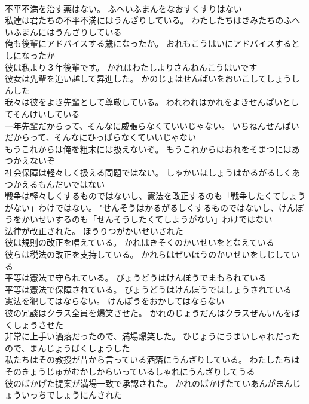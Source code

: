 \documentclass[8pt]{extreport}
\begin{document}
\begin{CJK}{UTF8}{min}
\\	不平不満を治す薬はない。	ふへいふまんをなおすくすりはない 
\\	私達は君たちの不平不満にはうんざりしている。	わたしたちはきみたちのふへいふまんにはうんざりしている 
\\	俺も後輩にアドバイスする歳になったか。	おれもこうはいにアドバイスするとしになったか 
\\	彼は私より３年後輩です。	かれはわたしよりさんねんこうはいです 
\\	彼女は先輩を追い越して昇進した。	かのじょはせんぱいをおいこしてしょうしんした 
\\	我々は彼をよき先輩として尊敬している。	われわれはかれをよきせんぱいとしてそんけいしている 
\\	一年先輩だからって、そんなに威張らなくていいじゃない。	いちねんせんぱいだからって、そんなにひっぱらなくていいじゃない 
\\	もうこれからは俺を粗末には扱えないぞ。	もうこれからはおれをそまつにはあつかえないぞ 
\\	社会保障は軽々しく扱える問題ではない。	しゃかいほしょうはかるがるしくあつかえるもんだいではない 
\\	戦争は軽々しくするものではないし、憲法を改正するのも「戦争したくてしょうがない」わけではない。	"せんそうはかるがるしくするものではないし、けんぽうをかいせいするのも「せんそうしたくてしようがない」わけではない 
\\	法律が改正された。	ほうりつがかいせいされた 
\\	彼は規則の改正を唱えている。	かれはきそくのかいせいをとなえている 
\\	彼らは税法の改正を支持している。	かれらはぜいほうのかいせいをしじしている 
\\	平等は憲法で守られている。	びょうどうはけんぽうでまもられている 
\\	平等は憲法で保障されている。	びょうどうはけんぽうでほしょうされている 
\\	憲法を犯してはならない。	けんぽうをおかしてはならない 
\\	彼の冗談はクラス全員を爆笑させた。	かれのじょうだんはクラスぜんいんをばくしょうさせた 
\\	非常に上手い洒落だったので、満場爆笑した。	ひじょうにうまいしゃれだったので、まんじょうばくしょうした 
\\	私たちはその教授が昔から言っている洒落にうんざりしている。	わたしたちはそのきょうじゅがむかしからいっているしゃれにうんざりしてうる 
\\	彼のばかげた提案が満場一致で承認された。	かれのばかげたていあんがまんじょういっちでしょうにんされた 

\end{CJK}
\end{document}
